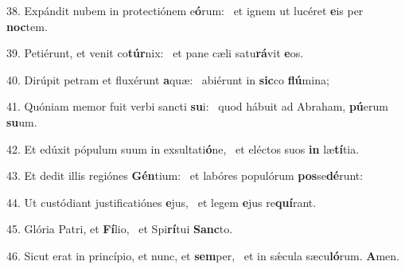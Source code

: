 38. Expándit nubem in protectiónem e\textbf{ó}rum: \ast\  et ignem ut lucéret \textbf{e}is per \textbf{noc}tem.\

39. Petiérunt, et venit co\textbf{túr}nix: \ast\  et pane cæli satu\textbf{rá}vit \textbf{e}os.\

40. Dirúpit petram et fluxérunt \textbf{a}quæ: \ast\  abiérunt in \textbf{sic}co \textbf{flú}mina;\

41. Quóniam memor fuit verbi sancti \textbf{su}i: \ast\  quod hábuit ad Abraham, \textbf{pú}erum \textbf{su}um.\

42. Et edúxit pópulum suum in exsultati\textbf{ó}ne, \ast\  et eléctos suos \textbf{in} læ\textbf{tí}tia.\

43. Et dedit illis regiónes \textbf{Gén}tium: \ast\  et labóres populórum \textbf{pos}se\textbf{dé}runt:\

44. Ut custódiant justificatiónes \textbf{e}jus, \ast\  et legem \textbf{e}jus re\textbf{quí}rant.\

45. Glória Patri, et \textbf{Fí}lio, \ast\  et Spi\textbf{rí}tui \textbf{Sanc}to.\

46. Sicut erat in princípio, et nunc, et \textbf{sem}per, \ast\  et in sǽcula sæcu\textbf{ló}rum. \textbf{A}men.\

